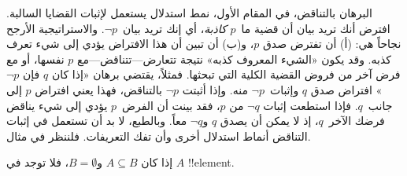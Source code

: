 \documentclass[../../../include/open-logic-section]{subfiles}
\begin{document}


البرهان بالتناقض، في المقام الأول، نمط استدلال يستعمل لإثبات القضايا
السالبة. افترض أنك تريد بيان أن قضية ما~$p$ \emph{كاذبة}، أي إنك تريد
بيان~$\lnot p$. والاستراتيجية الأرجح نجاحاً هي: (أ) أن تفترض صدق $p$،
و(ب) أن تبين أن هذا الافتراض يؤدي إلى شيء تعرف كذبه. وقد يكون «الشيء
المعروف كذبه» نتيجة تتعارض---تتناقض---مع $p$ نفسها، أو مع فرض آخر من
فروض القضية الكلية التي تبحثها. فمثلاً، يقتضي برهان «إذا كان $q$ فإن
$\lnot p$» افتراض صدق $q$ وإثبات~$\lnot p$ منه. وإذا أثبتت
$\lnot p$ بالتناقض، فهذا يعني افتراض $p$ إلى جانب~$q$. فإذا استطعت
إثبات $\lnot q$ من $p$، فقد بينت أن الفرض~$p$ يؤدي إلى شيء يناقض فرضك
الآخر~$q$، إذ لا يمكن أن يصدق $q$ و$\lnot q$ معاً. وبالطبع، لا بد أن
تستعمل في إثبات التناقض أنماط استدلال أخرى وأن تفك التعريفات. فلننظر في
مثال.

\begin{prop}
  إذا كان $A \subseteq B$ و$B = \emptyset$، فلا توجد في $A$
  !!{element}.
\end{prop}
\end{document}
